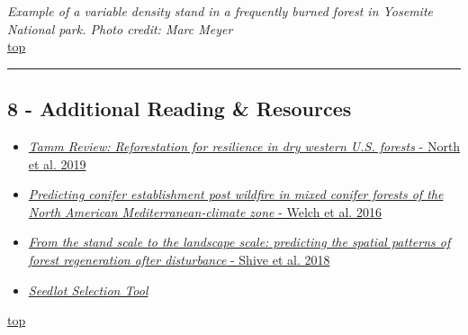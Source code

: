 \documentclass[]{article}
\begin{document}
 \emph{Example of a variable density stand in a frequently burned forest
in Yosemite National park. Photo credit: Marc Meyer}\\

\protect\hyperlink{top}{top}

\begin{center}\rule{0.5\linewidth}{\linethickness}\end{center}

\hypertarget{Link8}{\subsection{8 - Additional Reading \&
Resources}\label{Link8}}

\begin{itemize}
\item
  \href{https://www.sciencedirect.com/science/article/pii/S0378112718313161?via\%3Dihub}{\emph{Tamm
  Review: Reforestation for resilience in dry western U.S. forests} -
  North et al. 2019}
\item
  \href{https://esajournals.onlinelibrary.wiley.com/doi/full/10.1002/ecs2.1609}{\emph{Predicting
  conifer establishment post wildfire in mixed conifer forests of the
  North American Mediterranean‐climate zone} - Welch et al. 2016}
\item
  \href{https://esajournals.onlinelibrary.wiley.com/doi/10.1002/eap.1756}{\emph{From
  the stand scale to the landscape scale: predicting the spatial
  patterns of forest regeneration after disturbance} - Shive et al.
  2018}
\item
  \href{https://seedlotselectiontool.org/sst/}{\emph{Seedlot Selection
  Tool}}
\end{itemize}

\protect\hyperlink{top}{top}
\end{document}
